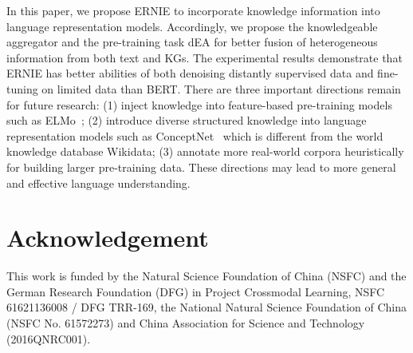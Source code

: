 \documentclass[11pt,a4paper]{article}
\begin{document}
In this paper, we propose ERNIE to incorporate knowledge information into language representation models. Accordingly, we propose the knowledgeable aggregator and the pre-training task dEA for better fusion of heterogeneous information from both text and KGs. The experimental results demonstrate that ERNIE has better abilities of both denoising distantly supervised data and fine-tuning on limited data than BERT. There are three important directions remain for future research: (1) inject knowledge into feature-based pre-training models such as ELMo~\cite{peters2018deep}; (2) introduce diverse structured knowledge into language representation models such as ConceptNet~\cite{speer2012representing} which is different from the world knowledge database Wikidata; (3) annotate more real-world corpora heuristically for building larger pre-training data. These directions may lead to more general and effective language understanding.



\section*{Acknowledgement}

This work is funded by the Natural Science Foundation of China (NSFC) and the German Research Foundation (DFG) in Project Crossmodal Learning, NSFC 61621136008 / DFG TRR-169, the National Natural Science Foundation of China (NSFC No. 61572273) and China Association for Science and Technology (2016QNRC001).


\small


\end{document}
